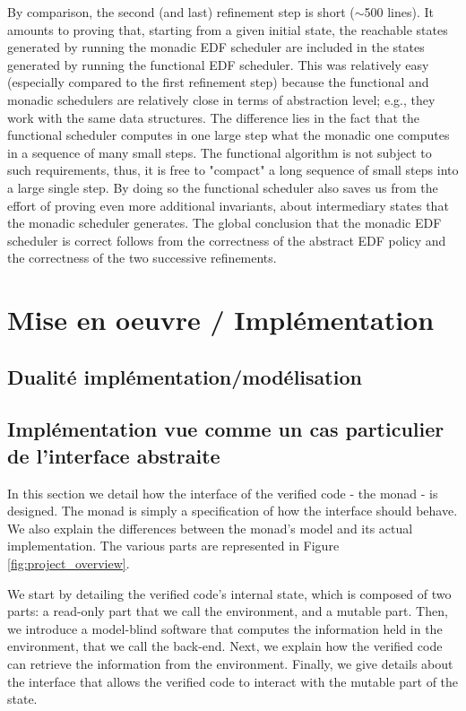 	By comparison, the second (and last) refinement step is short ($\sim$500 lines). It amounts to proving that, starting from a given initial state, the reachable states generated by running the monadic EDF scheduler are included in the states generated by running the functional EDF scheduler. This was relatively easy (especially compared to the first refinement step) because the functional and monadic schedulers are relatively close in terms of abstraction level; e.g., they work with the same data structures. The difference lies in the fact that the functional scheduler computes in one large step what the monadic one computes in a sequence of many small steps.  The functional algorithm is not subject to such requirements, thus, it is free to "compact" a long sequence of small steps into a large single step. By doing so the functional scheduler also saves us from the effort of proving even more additional invariants, about intermediary states that the monadic scheduler generates.  
\indent The global conclusion that the monadic EDF scheduler is correct follows from the correctness of the abstract EDF policy and the correctness of the two successive refinements.

	\section{Mise en oeuvre / Implémentation}
		\subsection{Dualité implémentation/modélisation}
		
		\subsection{Implémentation vue comme un cas particulier de l'interface abstraite}
	\label{sec:monad}

	In this section we detail how the interface of the verified code - the monad - is designed. The monad is simply a specification of how the interface should behave. We also explain the differences between the monad's model and its actual implementation.
	The various parts are represented in Figure \ref{fig:project_overview}.

	We start by detailing the verified code's internal state, which is composed of two parts: a read-only part that we call the environment, and a mutable part. Then, we introduce a model-blind software that computes the information held in the environment, that we call the back-end. Next, we  explain how the verified code can retrieve the information from the environment. Finally, we give details about the interface that allows the verified code to interact with the mutable part of the state.

